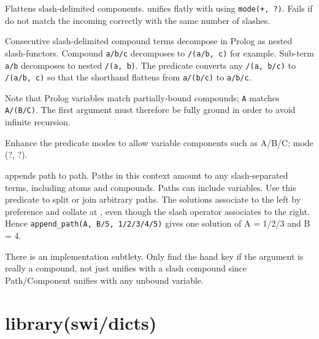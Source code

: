 \begin{description}
Flattens slash-delimited components.  unifies flatly with
 using \verb$mode(+, ?)$. Fails if  do not match the
incoming  correctly with the same number of slashes.

Consecutive slash-delimited compound terms decompose in Prolog as
nested slash-functors. Compound \verb$a/b/c$ decomposes to \verb$/(a/b, c)$
for example. Sub-term \verb$a/b$ decomposes to nested \verb$/(a, b)$. The
predicate converts any \verb$/(a, b/c)$ to \verb$/(a/b, c)$ so that the
shorthand flattens from \verb$a/(b/c)$ to \verb$a/b/c$.

Note that Prolog variables match partially-bound compounds; \verb$A$
matches \verb$A/(B/C)$. The first argument must therefore be fully ground
in order to avoid infinite recursion.

\begin{tags}
Enhance the predicate modes to allow variable components such
as A/B/C; mode (?, ?).
\end{tags}

 appends  path to  path. Paths in this context
amount to any slash-separated terms, including atoms and compounds.
Paths can include variables. Use this predicate to split or join
arbitrary paths. The solutions associate to the left by preference
and collate at , even though the slash operator associates to
the right. Hence \verb$append_path(A, B/5, 1/2/3/4/5)$ gives one solution
of A = 1/2/3 and B = 4.

There is an implementation subtlety. Only find the  hand key if
the argument is really a compound, not just unifies with a slash
compound since Path/Component unifies with any unbound variable.
\end{description}

\chapter{library(swi/dicts)}\label{sec:dicts}

